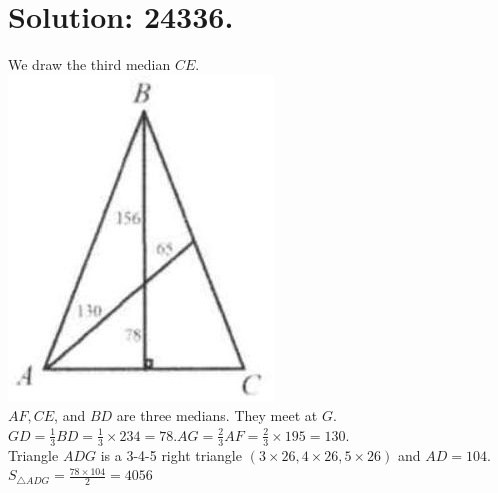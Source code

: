 \documentclass[10pt]{article}
\begin{document}
\section*{Solution: 24336.}
We draw the third median \(C E\).\\
\includegraphics[max width=\textwidth, center]{2025_04_17_97bc1f7e44d93c271a88g-010(1)}\\
\(A F, C E\), and \(B D\) are three medians. They meet at \(G\).\\
\(G D=\frac{1}{3} B D=\frac{1}{3} \times 234=78 . A G=\frac{2}{3} A F=\frac{2}{3} \times 195=130\).\\
Triangle \(A D G\) is a 3-4-5 right triangle \((3 \times 26,4 \times 26,5 \times 26)\) and \(A D=104\).\\
\(S_{\triangle A D G}=\frac{78 \times 104}{2}=4056\)\\
\end{document}
